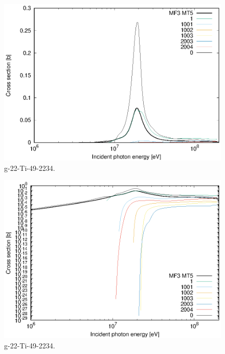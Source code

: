 \begin{figure}
 \includegraphics[width=\linewidth]{eps/g_22-Ti-49_2234.eps}
  \caption{g-22-Ti-49-2234.}
\end{figure}
\begin{figure}
 \includegraphics[width=\linewidth]{eps-log/g_22-Ti-49_2234.eps}
 \caption{g-22-Ti-49-2234.}
\end{figure}
\newpage \clearpage

